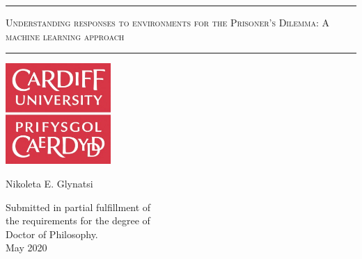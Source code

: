 \begin{titlepage}
	\begin{center}
		\vspace*{1cm}
		\vspace{10pt}

		\hrule
		\vspace{10pt}
		\huge
		\textsc{Understanding responses to environments for the Prisoner's Dilemma: A machine learning approach}
		\vspace{15pt}
		\hrule
		
		\vspace{2cm}

		\includegraphics[width=40mm]{cardiff_logo.jpg}
		\vspace{1cm}

		\LARGE
		 Nikoleta E. Glynatsi
		
		\vspace{2cm}
		\large
		Submitted in partial fulfillment of\\ the requirements for the degree of\\[0.35em] Doctor of Philosophy. \\
		\vspace{1cm}
		May 2020

	\end{center}
\end{titlepage}